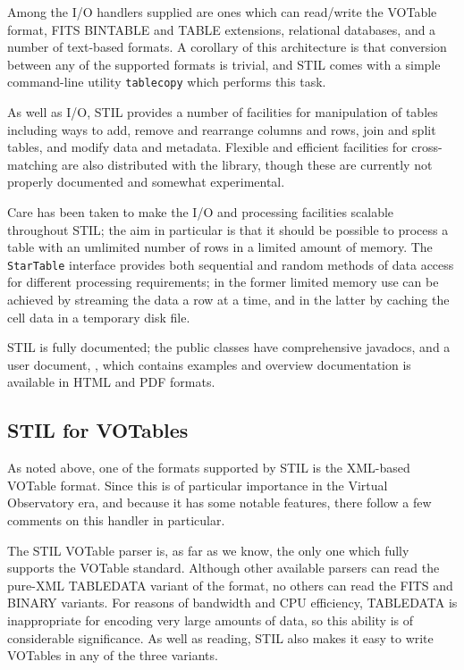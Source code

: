 \documentclass[11pt,twoside]{article}  %
\begin{document}
Among the I/O handlers supplied are ones which can read/write 
the VOTable format, 
FITS BINTABLE and TABLE extensions, 
relational databases, 
and a number of text-based formats.
A corollary of this architecture is that conversion between any of the
supported formats is trivial, and STIL comes with a simple
command-line utility {\tt tablecopy} which performs this task.

As well as I/O, STIL provides a number of facilities for manipulation 
of tables including ways to add, remove and rearrange columns and rows,
join and split tables, and modify data and metadata.
Flexible and efficient facilities for cross-matching are also distributed
with the library, though these are currently not properly documented
and somewhat experimental.

Care has been taken to make the I/O and processing facilities scalable
throughout STIL; the aim in particular is that it should be possible 
to process a table with an umlimited number of rows 
in a limited amount of memory.  
The {\tt StarTable} interface provides both sequential and random
methods of data access for different processing requirements; 
in the former limited memory use can be achieved
by streaming the data a row at a time, and in the latter by
caching the cell data in a temporary disk file.

STIL is fully documented; the public classes have comprehensive javadocs,
and a user document, 
, 
which contains examples and overview
documentation is available in HTML and PDF formats.

\subsection{STIL for VOTables}

As noted above, one of the formats supported by STIL is the XML-based
VOTable format.  Since this is of particular importance in the Virtual
Observatory era, and because it has some notable features, there follow
a few comments on this handler in particular.

The STIL VOTable parser is, as far as we know, the only one
which fully supports the VOTable standard.
Although other available parsers can read the pure-XML {\sc TABLEDATA} 
variant of the format, no others can read the {\sc FITS} and {\sc BINARY} 
variants.
For reasons of bandwidth and CPU efficiency, {\sc TABLEDATA} is inappropriate
for encoding very large amounts of data, so this ability is of
considerable significance.  As well as reading,
STIL also makes it easy to write VOTables in any of the three variants.
\end{document}
